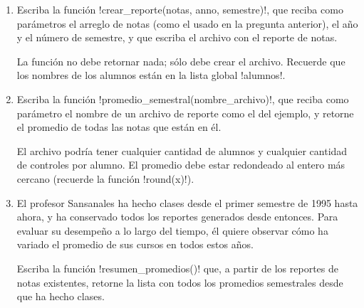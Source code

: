 \begin{enumerate}[leftmargin=0pt,label=\emph{\alph*})]

%    

  \item
    Escriba la función \li!crear_reporte(notas, anno, semestre)!,
    que reciba como parámetros el arreglo de notas
    (como el usado en la pregunta anterior),
    el año y el número de semestre,
    y que escriba el archivo con el reporte de notas.
    

    La función no debe retornar nada; sólo debe crear el archivo.
    Recuerde que los nombres de los alumnos
    están en la lista global \li!alumnos!.

  \item
    Escriba la función \li!promedio_semestral(nombre_archivo)!,
    que reciba como parámetro el nombre de un archivo
    de reporte como el del ejemplo,
    y retorne el promedio de todas las notas que están en él.
    

    El archivo podría tener cualquier cantidad de alumnos
    y cualquier cantidad de controles por alumno.
    El promedio debe estar redondeado
    al entero más cercano (recuerde la función \li!round(x)!).

  \item
    El profesor Sansanales ha hecho clases
    desde el primer semestre de 1995 hasta ahora,
    y ha conservado todos los reportes generados desde entonces.
    Para evaluar su desempeño a lo largo del tiempo,
    él quiere observar cómo ha variado el promedio de sus cursos
    en todos estos años.

    Escriba la función \li!resumen_promedios()! que,
    a partir de los reportes de notas existentes,
    retorne la lista con todos los promedios semestrales
    desde que ha hecho clases.

\end{enumerate}

